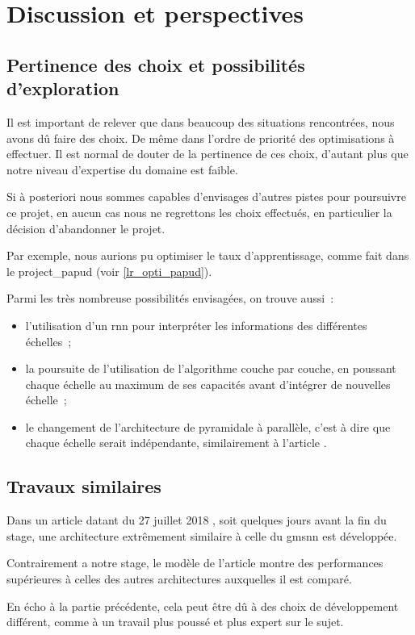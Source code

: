 \section{Discussion et perspectives}
\subsection{Pertinence des choix et possibilités d'exploration}
Il est important de relever que dans beaucoup des situations rencontrées, nous avons dû faire des choix. De même dans l'ordre de priorité des optimisations à effectuer. 
Il est normal de douter de la pertinence de ces choix, d'autant plus que notre niveau d'expertise du domaine est faible.

Si à posteriori nous sommes capables d'envisages d'autres pistes pour poursuivre ce projet, en aucun cas nous ne regrettons les choix effectués, en particulier la décision d'abandonner le projet.

Par exemple, nous aurions pu optimiser le taux d'apprentissage, comme fait dans le \gls{project_papud} (voir \autoref{lr_opti_papud}).

Parmi les très nombreuse possibilités envisagées, on trouve aussi~:
\begin{itemize}
	\item l'utilisation d'un \gls{rnn} pour interpréter les informations des différentes échelles~;
	\item la poursuite de l'utilisation de l'algorithme couche par couche, en poussant chaque échelle au maximum de ses capacités avant d'intégrer de nouvelles échelle~;
	\item le changement de l'architecture de pyramidale à parallèle, c'est à dire que chaque échelle serait indépendante, similairement à l'article \autocite{Xiao2018Jan}.
\end{itemize}

\subsection{Travaux similaires}
Dans un article datant du 27 juillet 2018 \autocite{hierachical_rnn}, soit quelques jours avant la fin du stage, une architecture extrêmement similaire à celle du \gls{gmsnn} est développée.

Contrairement a notre stage, le modèle de l'article montre des performances supérieures à celles des autres architectures auxquelles il est comparé.

En écho à la partie précédente, cela peut être dû à des choix de développement différent, comme à un travail plus poussé et plus expert sur le sujet.
